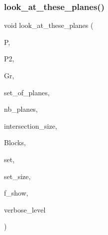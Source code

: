\subsubsection{\texorpdfstring{look\+\_\+at\+\_\+these\+\_\+planes()}{look\_at\_these\_planes()}}
{\footnotesize\ttfamily void look\+\_\+at\+\_\+these\+\_\+planes (\begin{DoxyParamCaption}\item[{\mbox{\hyperlink{classprojective__space}{projective\+\_\+space}} $\ast$}]{P,  }\item[{\mbox{\hyperlink{classprojective__space}{projective\+\_\+space}} $\ast$}]{P2,  }\item[{\mbox{\hyperlink{classgrassmann}{grassmann}} $\ast$}]{Gr,  }\item[{\mbox{\hyperlink{galois_8h_a09fddde158a3a20bd2dcadb609de11dc}{I\+NT}} $\ast$}]{set\+\_\+of\+\_\+planes,  }\item[{\mbox{\hyperlink{galois_8h_a09fddde158a3a20bd2dcadb609de11dc}{I\+NT}}}]{nb\+\_\+planes,  }\item[{\mbox{\hyperlink{galois_8h_a09fddde158a3a20bd2dcadb609de11dc}{I\+NT}}}]{intersection\+\_\+size,  }\item[{\mbox{\hyperlink{galois_8h_a09fddde158a3a20bd2dcadb609de11dc}{I\+NT}} $\ast$}]{Blocks,  }\item[{\mbox{\hyperlink{galois_8h_a09fddde158a3a20bd2dcadb609de11dc}{I\+NT}} $\ast$}]{set,  }\item[{\mbox{\hyperlink{galois_8h_a09fddde158a3a20bd2dcadb609de11dc}{I\+NT}}}]{set\+\_\+size,  }\item[{\mbox{\hyperlink{galois_8h_a09fddde158a3a20bd2dcadb609de11dc}{I\+NT}}}]{f\+\_\+show,  }\item[{\mbox{\hyperlink{galois_8h_a09fddde158a3a20bd2dcadb609de11dc}{I\+NT}}}]{verbose\+\_\+level }\end{DoxyParamCaption})}

\mbox{\label{analyze_8_c_ae230005122bb89f7409f5937134b73bf}} 
